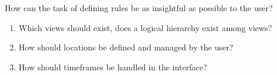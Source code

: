 %
%
\section{}


How can the task of defining rules be as insightful as possible to the user?
\begin{enumerate}
    \item Which views should exist, does a logical hierarchy exist among views?
    \item How should locations be defined and managed by the user?
    \item How should timeframes be handled in the interface?
\end{enumerate}

